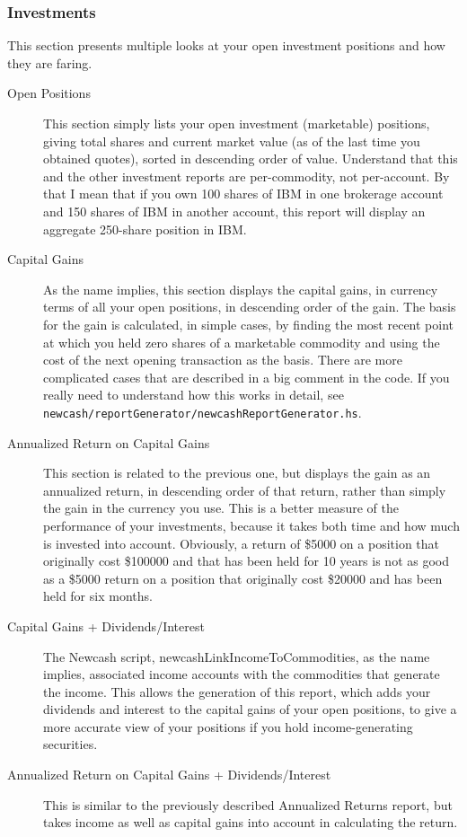 \documentclass{report}
\begin{document}
\subsubsection{Investments}
This section presents multiple looks at your open investment positions and how they are faring.
\begin{description}
\item[Open Positions] This section simply lists your open investment (marketable) positions, giving total shares and current market value (as of the last time you obtained quotes), sorted in descending order of value. Understand that this and the other investment reports are per-commodity, not per-account. By that I mean that if you own 100 shares of IBM in one brokerage account and 150 shares of IBM in another account, this report will display an aggregate 250-share position in IBM.
\item[Capital Gains] As the name implies, this section displays the capital gains, in currency terms of all your open positions, in descending order of the gain. The basis for the gain is calculated, in simple cases, by finding the most recent point at which you held zero shares of a marketable commodity and using the cost of the next opening transaction as the basis. There are more complicated cases that are described in a big comment in the code. If you really need to understand how this works in detail, see \verb|newcash/reportGenerator/newcashReportGenerator.hs|.
\item[Annualized Return on Capital Gains] This section is related to the previous one, but displays the gain as an annualized return, in descending order of that return, rather than simply the gain in the currency you use. This is a better measure of the performance of your investments, because it takes both time and how much is invested into account. Obviously, a return of \$5000 on a position that originally cost \$100000 and that has been held for 10 years is not as good as a \$5000 return on a position that originally cost \$20000 and has been held for six months.
\item[Capital Gains + Dividends/Interest] The Newcash script, newcashLinkIncomeToCommodities, as the name implies, associated income accounts with the commodities that generate the income. This allows the generation of this report, which adds your dividends and interest to the capital gains of your open positions, to give a more accurate view of your positions if you hold income-generating securities.
\item[Annualized Return on Capital Gains + Dividends/Interest] This is similar to the previously described Annualized Returns report, but takes income as well as capital gains into account in calculating the return.
\end{description}
\end{document}
